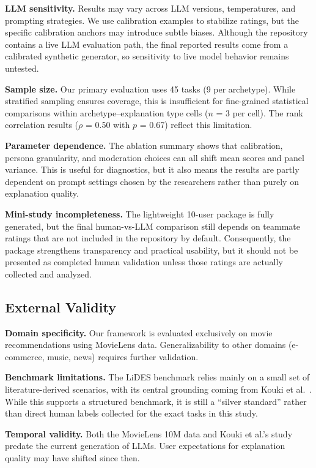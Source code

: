 \documentclass[sigconf,nonacm]{acmart}
\begin{document}
\textbf{LLM sensitivity.} Results may vary across LLM versions, temperatures, and prompting strategies. We use calibration examples to stabilize ratings, but the specific calibration anchors may introduce subtle biases. Although the repository contains a live LLM evaluation path, the final reported results come from a calibrated synthetic generator, so sensitivity to live model behavior remains untested.

\textbf{Sample size.} Our primary evaluation uses 45 tasks (9 per archetype). While stratified sampling ensures coverage, this is insufficient for fine-grained statistical comparisons within archetype--explanation type cells ($n$ = 3 per cell). The rank correlation results ($\rho$ = 0.50 with $p$ = 0.67) reflect this limitation.

\textbf{Parameter dependence.} The ablation summary shows that calibration, persona granularity, and moderation choices can all shift mean scores and panel variance. This is useful for diagnostics, but it also means the results are partly dependent on prompt settings chosen by the researchers rather than purely on explanation quality.

\textbf{Mini-study incompleteness.} The lightweight 10-user package is fully generated, but the final human-vs-LLM comparison still depends on teammate ratings that are not included in the repository by default. Consequently, the package strengthens transparency and practical usability, but it should not be presented as completed human validation unless those ratings are actually collected and analyzed.

\subsection{External Validity}

\textbf{Domain specificity.} Our framework is evaluated exclusively on movie recommendations using MovieLens data. Generalizability to other domains (e-commerce, music, news) requires further validation.

\textbf{Benchmark limitations.} The LiDES benchmark relies mainly on a small set of literature-derived scenarios, with its central grounding coming from Kouki et al.~\cite{kouki2019}. While this supports a structured benchmark, it is still a ``silver standard'' rather than direct human labels collected for the exact tasks in this study.

\textbf{Temporal validity.} Both the MovieLens 10M data and Kouki et al.'s study predate the current generation of LLMs. User expectations for explanation quality may have shifted since then.
\end{document}
